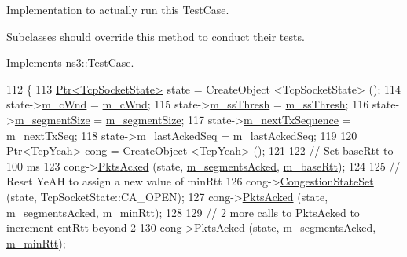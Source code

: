 Implementation to actually run this Test\+Case. 

Subclasses should override this method to conduct their tests. 

Implements \hyperlink{classns3_1_1TestCase_a8ff74680cf017ed42011e4be51917a24}{ns3\+::\+Test\+Case}.


\begin{DoxyCode}
112 \{
113   \hyperlink{classns3_1_1Ptr}{Ptr<TcpSocketState>} state = CreateObject <TcpSocketState> ();
114   state->\hyperlink{classns3_1_1TcpSocketState_a7cd3d2156a483c1db436097477a0fd7f}{m\_cWnd} = \hyperlink{classTcpYeahIncrementTest_a3661dc763cb1315b447146422578f251}{m\_cWnd};
115   state->\hyperlink{classns3_1_1TcpSocketState_aec003b6dba9d269bfb1036c7652ffbd6}{m\_ssThresh} = \hyperlink{classTcpYeahIncrementTest_a8e3638319f857c50fceeb89c2c6cdabf}{m\_ssThresh};
116   state->\hyperlink{classns3_1_1TcpSocketState_a079872f7b0099ef5f3cab4ff47bd2edd}{m\_segmentSize} = \hyperlink{classTcpYeahIncrementTest_a6b999589e0dd543d73c2a47f0a1dcaf7}{m\_segmentSize};
117   state->\hyperlink{classns3_1_1TcpSocketState_ad1f77b1cbdb9267a89ebb6f16ac76892}{m\_nextTxSequence} = \hyperlink{classTcpYeahIncrementTest_a836b1008465881036eb4f1f15e16b72a}{m\_nextTxSeq};
118   state->\hyperlink{classns3_1_1TcpSocketState_a7a30ba2b675238429c7fe2f0c8d1ce94}{m\_lastAckedSeq} = \hyperlink{classTcpYeahIncrementTest_a7b14dd335b9a584c3f4379e5c0a795e4}{m\_lastAckedSeq};
119 
120   \hyperlink{classns3_1_1Ptr}{Ptr<TcpYeah>} cong = CreateObject <TcpYeah> ();
121 
122   \textcolor{comment}{// Set baseRtt to 100 ms}
123   cong->\hyperlink{classns3_1_1TcpYeah_a2423d9c6a6aea3c8e58749c9219d2fbd}{PktsAcked} (state, \hyperlink{classTcpYeahIncrementTest_a1e5cfd14d9a88d4dcdfb8afcc26fa107}{m\_segmentsAcked}, \hyperlink{classTcpYeahIncrementTest_a5fba73c69f81dc327c87218ba1bff4b6}{m\_baseRtt});
124 
125   \textcolor{comment}{// Reset YeAH to assign a new value of minRtt}
126   cong->\hyperlink{classns3_1_1TcpYeah_ad3d8b9d44b3a29ab9f30aabc4af9c08a}{CongestionStateSet} (state, TcpSocketState::CA\_OPEN);
127   cong->\hyperlink{classns3_1_1TcpYeah_a2423d9c6a6aea3c8e58749c9219d2fbd}{PktsAcked} (state, \hyperlink{classTcpYeahIncrementTest_a1e5cfd14d9a88d4dcdfb8afcc26fa107}{m\_segmentsAcked}, \hyperlink{classTcpYeahIncrementTest_adc856d8e85a4fe25a0445228fe98f2d5}{m\_minRtt});
128 
129   \textcolor{comment}{// 2 more calls to PktsAcked to increment cntRtt beyond 2}
130   cong->\hyperlink{classns3_1_1TcpYeah_a2423d9c6a6aea3c8e58749c9219d2fbd}{PktsAcked} (state, \hyperlink{classTcpYeahIncrementTest_a1e5cfd14d9a88d4dcdfb8afcc26fa107}{m\_segmentsAcked}, \hyperlink{classTcpYeahIncrementTest_adc856d8e85a4fe25a0445228fe98f2d5}{m\_minRtt});

\end{DoxyCode}

